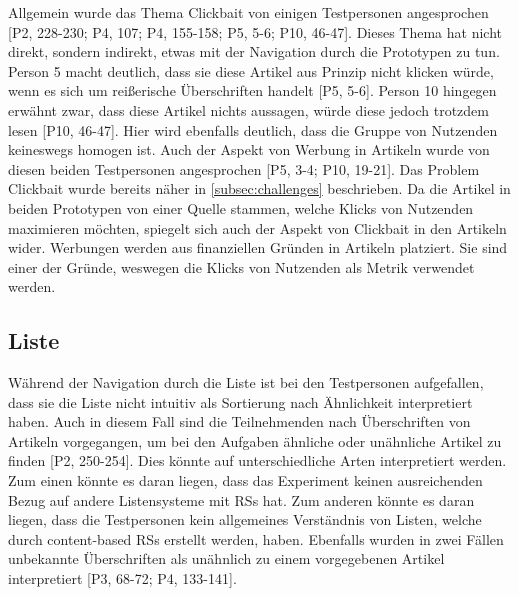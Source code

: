 Allgemein wurde das Thema Clickbait von einigen Testpersonen angesprochen [P2, 228-230; P4, 107; P4, 155-158; P5, 5-6; P10, 46-47].
Dieses Thema hat nicht direkt, sondern indirekt, etwas mit der Navigation durch die Prototypen zu tun.
Person 5 macht deutlich, dass sie diese Artikel aus Prinzip nicht klicken würde, wenn es sich um reißerische Überschriften handelt [P5, 5-6].
Person 10 hingegen erwähnt zwar, dass diese Artikel \glqq nichts aussagen\grqq{}, würde diese jedoch trotzdem lesen [P10, 46-47].
Hier wird ebenfalls deutlich, dass die Gruppe von Nutzenden keineswegs homogen ist.
Auch der Aspekt von Werbung in Artikeln wurde von diesen beiden Testpersonen angesprochen [P5, 3-4; P10, 19-21].
Das Problem Clickbait wurde bereits näher in \autoref{subsec:challenges} beschrieben.
Da die Artikel in beiden Prototypen von einer Quelle stammen, welche Klicks von Nutzenden maximieren möchten, spiegelt sich auch der Aspekt von Clickbait in den Artikeln wider.
Werbungen werden aus finanziellen Gründen in Artikeln platziert.
Sie sind einer der Gründe, weswegen die Klicks von Nutzenden als Metrik verwendet werden.

\subsection{Liste}
Während der Navigation durch die Liste ist bei den Testpersonen aufgefallen, dass sie die Liste nicht intuitiv als Sortierung nach Ähnlichkeit interpretiert haben.
Auch in diesem Fall sind die Teilnehmenden nach Überschriften von Artikeln vorgegangen, um bei den Aufgaben ähnliche oder unähnliche Artikel zu finden [P2, 250-254].
Dies könnte auf unterschiedliche Arten interpretiert werden.
Zum einen könnte es daran liegen, dass das Experiment keinen ausreichenden Bezug auf andere Listensysteme mit \acp{RS} hat.
Zum anderen könnte es daran liegen, dass die Testpersonen kein allgemeines Verständnis von Listen, welche durch content-based \acp{RS} erstellt werden, haben.
Ebenfalls wurden in zwei Fällen unbekannte Überschriften als unähnlich zu einem vorgegebenen Artikel interpretiert [P3, 68-72; P4, 133-141].\\


